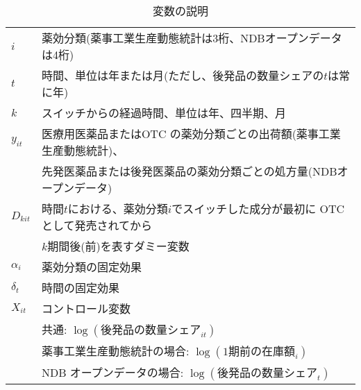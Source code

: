\documentclass[a4paper,11pt,uplatex]{jsarticle}
\theoremstyle{definition}
\begin{document}
\begin{table}[H] \caption{変数の説明}\label{tab:event}
    \begin{tabular}{ll}
       \toprule 
       \(i\)&薬効分類(薬事工業生産動態統計は3桁、NDBオープンデータは4桁)\\
       \(t\)&時間、単位は年または月(ただし、後発品の数量シェアの\(t\)は常に年)\\
       \(k\)&スイッチからの経過時間、単位は年、四半期、月\\
    $y_{it}$ & 医療用医薬品またはOTC の薬効分類ごとの出荷額(薬事工業生産動態統計)、\\
    & 先発医薬品または後発医薬品の薬効分類ごとの処方量(NDBオープンデータ)\\
    $D_{kit}$ & 時間\(t\)における、薬効分類\(i\)でスイッチした成分が最初に OTC として発売されてから\\
    & \(k\)期間後(前)を表すダミー変数\\
    $\alpha_i$ & 薬効分類の固定効果\\
    $\delta_t$ & 時間の固定効果\\
    $X_{it}$ & コントロール変数\\
    & 共通: $\log(後発品の数量シェア_{it})$\\
    & 薬事工業生産動態統計の場合: $\log(1期前の在庫額_i)$\\
    & \textrm{NDB} オープンデータの場合: $\log(後発品の数量シェア_t)$ \\
    \bottomrule
    \end{tabular}
\end{table}
\end{document}
